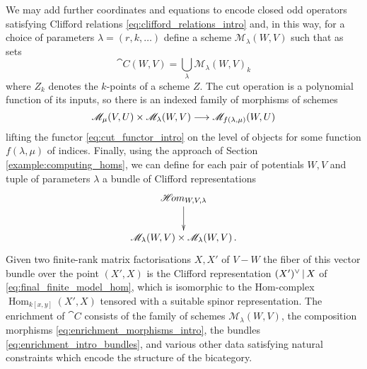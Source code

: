 \documentclass[english,letter paper,12pt,leqno]{article}
\theoremstyle{example}
\numberwithin{equation}{section}
\def\LG{\mathcal{LG}}
\def\Hom{\operatorname{Hom}}
\def\be{\begin{equation}}
\def\ee{\end{equation}}
\def\L{\mathcal{C}}
\begin{document}
We may add further coordinates and equations to encode closed odd operators satisfying Clifford relations \eqref{eq:clifford_relations_intro} and, in this way, for a choice of parameters $\lambda = (r, k, \ldots)$ define a scheme $\mathscr{M}_{\lambda}(W,V)$ such that as sets
\begin{equation}\label{eq:param_frmf}
\cat{C}(W,V) = \bigcup_{\lambda} \mathscr{M}_{\lambda}(W,V)_{k}
\end{equation}
where $Z_{k}$ denotes the $k$-points of a scheme $Z$. The cut operation is a polynomial function of its inputs, so there is an indexed family of morphisms of schemes
\be\label{eq:enrichment_morphisms_intro}
\mathscr{M}_\mu(V,U) \times \mathscr{M}_\lambda(W,V) \lto \mathscr{M}_{f(\lambda, \mu)}(W, U)
\ee
lifting the functor \eqref{eq:cut_functor_intro} on the level of objects for some function $f(\lambda, \mu)$ of indices. Finally, using the approach of Section \ref{example:computing_homs}, we can define for each pair of potentials $W,V$ and tuple of parameters $\lambda$ a bundle of Clifford representations
\be\label{eq:enrichment_intro_bundles}
\xymatrix{
\mathscr{H}\! om_{W,V,\lambda} \ar[d]\\
\mathscr{M}_\lambda(W,V) \times \mathscr{M}_\lambda(W,V)\,.
}
\ee
Given two finite-rank matrix factorisations $X,X'$ of $V - W$ the fiber of this vector bundle over the point $(X',X)$ is the Clifford representation $(X')^{\vee} \,|\, X$ of \eqref{eq:final_finite_model_hom}, which is isomorphic to the Hom-complex $\Hom_{k[x,y]}(X',X)$ tensored with a suitable spinor representation. The enrichment of $\cat{C}$ consists of the family of schemes $\mathscr{M}_\lambda(W,V)$, the composition morphisms \eqref{eq:enrichment_morphisms_intro}, the bundles \eqref{eq:enrichment_intro_bundles}, and various other data satisfying natural constraints which encode the structure of the bicategory.




\end{document}
